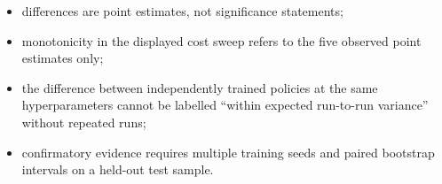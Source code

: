 \begin{itemize}[leftmargin=2em]
  \item differences are point estimates, not significance statements;
  \item monotonicity in the displayed cost sweep refers to the five observed
  point estimates only;
  \item the difference between independently trained policies at the same
  hyperparameters cannot be labelled ``within expected run-to-run variance''
  without repeated runs;
  \item confirmatory evidence requires multiple training seeds and paired
  bootstrap intervals on a held-out test sample.
\end{itemize}

